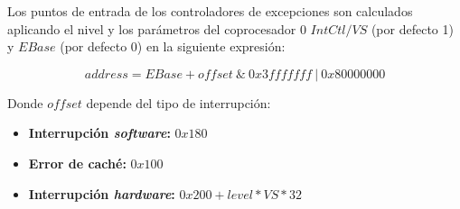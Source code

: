 \noindent Los puntos de entrada de los controladores de excepciones
son calculados aplicando el nivel y los parámetros del coprocesador
0 $IntCtl/VS$ (por defecto 1) y $EBase$ (por defecto 0) en la
siguiente expresión:

\[address = EBase + offset \ \& \ 0x3fffffff \ | \ 0x80000000\]

\noindent Donde $offset$ depende del tipo de interrupción:
\begin{itemize}
    \item \textbf{Interrupción \textit{software}:} $0x180$
    \item \textbf{Error de caché:} $0x100$
    \item \textbf{Interrupción \textit{hardware}:} $0x200 + level * VS * 32$
\end{itemize}